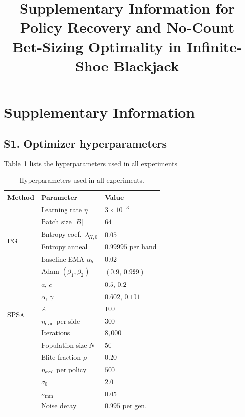 \documentclass[12pt]{article}
\title{\large\bfseries Supplementary Information for\\[4pt]
\normalsize Policy Recovery and No-Count Bet-Sizing Optimality in Infinite-Shoe Blackjack}
\begin{document}
\maketitle
\thispagestyle{plain}

\section*{Supplementary Information}

\subsection*{S1. Optimizer hyperparameters}

Table~\ref{tab:hparams} lists the hyperparameters used in all experiments.

\begin{table}[h]
\centering
\caption{Hyperparameters used in all experiments.}
\label{tab:hparams}
\small
\begin{tabular}{lll}
\toprule
Method & Parameter & Value \\
\midrule
\multirow{6}{*}{PG}
  & Learning rate $\eta$ & $3 \times 10^{-3}$ \\
  & Batch size $|B|$ & $64$ \\
  & Entropy coef.\ $\lambda_{H,0}$ & $0.05$ \\
  & Entropy anneal & $0.99995$ per hand \\
  & Baseline EMA $\alpha_b$ & $0.02$ \\
  & Adam $(\beta_1, \beta_2)$ & $(0.9,\,0.999)$ \\
\midrule
\multirow{6}{*}{SPSA}
  & $a$, $c$ & $0.5$, $0.2$ \\
  & $\alpha$, $\gamma$ & $0.602$, $0.101$ \\
  & $A$ & $100$ \\
  & $n_\mathrm{eval}$ per side & $300$ \\
  & Iterations & $8{,}000$ \\
\midrule
\multirow{6}{*}{CEM}
  & Population size $N$ & $50$ \\
  & Elite fraction $\rho$ & $0.20$ \\
  & $n_\mathrm{eval}$ per policy & $500$ \\
  & $\sigma_0$ & $2.0$ \\
  & $\sigma_\mathrm{min}$ & $0.05$ \\
  & Noise decay & $0.995$ per gen.\ \\
\bottomrule
\end{tabular}
\end{table}
\end{document}
